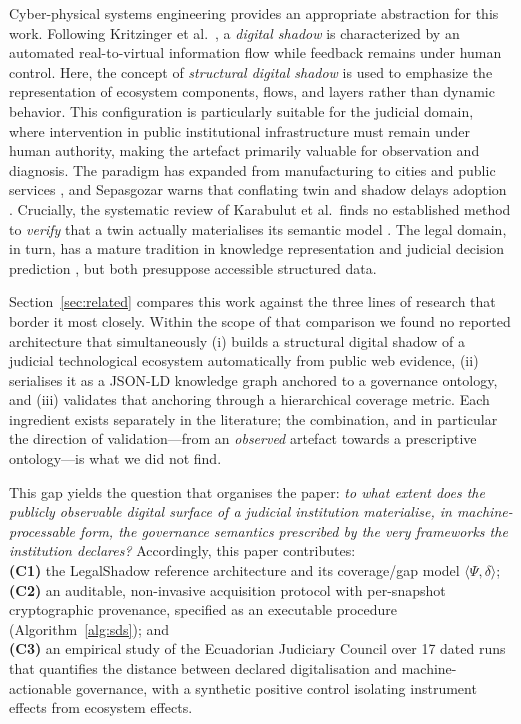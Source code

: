 \documentclass[engproc,proceedingpaper,submit,moreauthors]{Definitions/mdpi}
\begin{document}
    Cyber-physical systems engineering provides an appropriate abstraction for this work. Following Kritzinger et al.\ \cite{Kritzinger2018}, a \emph{digital shadow} is characterized by an automated real-to-virtual information flow while feedback remains under human control. Here, the concept of \emph{structural digital shadow} is used to emphasize the representation of ecosystem components, flows, and layers rather than dynamic behavior. This configuration is particularly suitable for the judicial domain, where intervention in public institutional infrastructure must remain under human authority, making the artefact primarily valuable for observation and diagnosis.
    The paradigm has expanded from manufacturing \cite{Tao2019} to cities and public services \cite{Shahat2021,Brauner2022}, and Sepasgozar warns that conflating twin and shadow delays adoption \cite{Sepasgozar2021}. Crucially, the systematic review of Karabulut et al.\ finds no established method to \emph{verify} that a twin actually materialises its semantic model \cite{Karabulut2024}. The legal domain, in turn, has a mature tradition in knowledge representation \cite{Casanovas2016} and judicial decision prediction \cite{Medvedeva2020}, but both presuppose accessible structured data.

    Section~\ref{sec:related} compares this work against the three lines of research that border it most closely. Within the scope of that comparison we found no reported architecture that simultaneously 
    (i) builds a structural digital shadow of a judicial technological ecosystem automatically from public web evidence, 
    (ii) serialises it as a JSON-LD knowledge graph anchored to a governance ontology, and 
    (iii) validates that anchoring through a hierarchical coverage metric. Each ingredient exists separately in the literature; the combination, and in particular the direction of validation---from an \emph{observed} artefact towards a prescriptive ontology---is what we did not find.

    This gap yields the question that organises the paper: \emph{to what extent does the publicly observable digital surface of a judicial institution materialise, in machine-processable form, the governance semantics prescribed by the very frameworks the institution declares?} Accordingly, this paper contributes: 
    \\\textbf{(C1)} the LegalShadow reference architecture and its coverage/gap model $\langle\Psi,\delta\rangle$; 
    \\\textbf{(C2)} an auditable, non-invasive acquisition protocol with per-snapshot cryptographic provenance, specified as an executable procedure (Algorithm~\ref{alg:sds}); and 
    \\\textbf{(C3)} an empirical study of the Ecuadorian Judiciary Council over 17 dated runs that quantifies the distance between declared digitalisation and machine-actionable governance, with a synthetic positive control isolating instrument effects from ecosystem effects.
\end{document}
